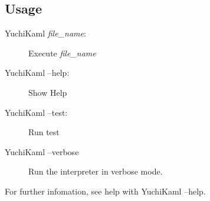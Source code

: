 \subsection{Usage}

\begin{description}
    \item[YuchiKaml \emph{file\_name}:] Execute \emph{file\_name}
    \item[YuchiKaml --help:] Show Help
    \item[YuchiKaml --test:] Run test
    \item[YuchiKaml --verbose]  Run the interpreter in verbose mode.
\end{description}
For further infomation, see help with YuchiKaml --help.
